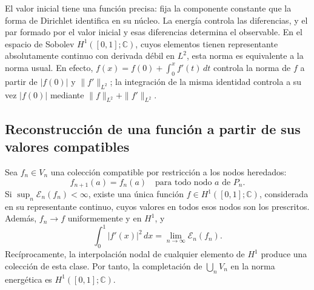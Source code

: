 El valor inicial tiene una función precisa: fija la componente constante
que la forma de Dirichlet identifica en su núcleo. La energía controla
las diferencias, y el par formado por el valor inicial y esas diferencias
determina el observable. En el espacio de Sobolev
\(H^1([0,1];\mathbb C)\), cuyos elementos tienen representante
absolutamente continuo con derivada débil en \(L^2\), esta norma es
equivalente a la norma usual. En efecto,
\(f(x)=f(0)+\int_0^xf'(t)\,dt\) controla la norma de \(f\) a
partir de \(|f(0)|\) y \(\|f'\|_{L^2}\); la integración de la
misma identidad controla a su vez \(|f(0)|\) mediante
\(\|f\|_{L^2}+\|f'\|_{L^2}\).

\subsection{Reconstrucción de una función a partir de sus valores compatibles}

\begin{theorem}
\label{thm:limite-energia-h1-k}
Sea \(f_n\in V_n\) una colección compatible por restricción a los
nodos heredados:
\[
 f_{n+1}(a)=f_n(a)
 \quad\text{para todo nodo }a\text{ de }P_n.
\]
Si \(\sup_n\mathcal E_n(f_n)<\infty\), existe una única función
\(f\in H^1([0,1];\mathbb C)\), considerada en su representante
continuo, cuyos valores en todos esos nodos son los prescritos. Además,
\(f_n\to f\) uniformemente y en \(H^1\), y
\begin{equation}
 \int_0^1|f'(x)|^2\,dx
 =\lim_{n\to\infty}\mathcal E_n(f_n).
 \label{eq:limite-energia-h1-k}
\end{equation}
Recíprocamente, la interpolación nodal de cualquier elemento de \(H^1\)
produce una colección de esta clase. Por tanto, la completación de
\(\bigcup_n V_n\) en la norma energética es \(H^1([0,1];\mathbb C)\).
\end{theorem}

